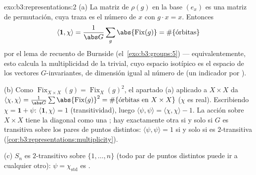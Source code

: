 \begin{solution}{exo:b3:representations:2}
(a) La matriz de $\rho(g)$ en la base $(e_x)$ es una matriz de
permutación, cuya traza es el número de $x$ con $g\cdot x =
x$. Entonces
\[
\langle\mathbf 1, \chi\rangle = \frac1{\abs G}\sum_g
\abs{\operatorname{Fix}(g)} = \#\{\text{órbitas}\}
\]
por el lema de recuento de Burnside (el~\cref{exo:b3:groups:5}) ---
equivalentemente, esto calcula la multiplicidad de la
 trivial, cuyo
espacio isotípico es el espacio de los vectores $G$-invariantes, de
dimensión igual al número de  (un
indicador por ).

(b) Como $\operatorname{Fix}_{X\times X}(g) =
\operatorname{Fix}_X(g)^2$, el apartado (a) aplicado a $X \times X$ da
$\langle\chi,\chi\rangle = \frac1{\abs
G}\sum\abs{\operatorname{Fix}(g)}^2 = \#\{\text{órbitas en }
X\times X\}$ ($\chi$ es real). Escribiendo $\chi = \mathbf 1 +
\psi$: $\langle\mathbf1,\chi\rangle = 1$ (transitividad), luego
$\langle\psi,\psi\rangle = \langle\chi,\chi\rangle - 1$. La acción sobre
$X\times X$ tiene la diagonal como una
; hay exactamente otra
 si y solo si $G$ es transitiva
sobre los pares de puntos distintos: $\langle\psi,\psi\rangle = 1$ si y
solo si es $2$-transitiva
(\cref{cor:b3:representations:multiplicity}).

(c) $S_n$ es $2$-transitivo sobre $\{1,\dots,n\}$ (todo par de puntos
distintos puede ir a cualquier otro): $\psi = \chi_{\mathrm{std}}$ es
.
\end{solution}

